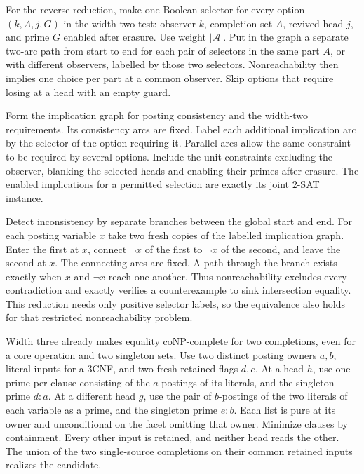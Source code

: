 For the reverse reduction, make one Boolean
selector for every option $(k,A,j,G)$ in the
width-two test: observer $k$, completion set $A$,
revived head $j$, and prime $G$ enabled after
erasure. Use weight $|\mathcal A|$. Put in the
graph a separate two-arc path from start to end
for each pair of selectors in the same part $A$,
or with different observers, labelled by those
two selectors. Nonreachability then implies
one choice per part at a common observer.
Skip options that require losing at a head
with an empty guard.

Form the implication graph for posting
consistency and the width-two requirements.
Its consistency arcs are fixed. Label
each additional implication arc by the
selector of the option requiring it.
Parallel arcs allow the same constraint to
be required by several options. Include the
unit constraints excluding the observer,
blanking the selected heads and enabling
their primes after erasure. The enabled
implications for a permitted selection are
exactly its joint $2$-SAT instance.

Detect inconsistency by separate branches
between the global start and end. For
each posting variable $x$ take two fresh
copies of the labelled implication graph.
Enter the first at $x$, connect $\neg x$
of the first to $\neg x$ of the second,
and leave the second at $x$. The connecting
arcs are fixed. A path through the branch
exists exactly when $x$ and $\neg x$ reach
one another. Thus nonreachability excludes
every contradiction and exactly verifies a
counterexample to sink intersection equality.
This reduction needs only positive selector
labels, so the equivalence also holds for
that restricted nonreachability problem.

Width three already makes equality coNP-complete
for two completions, even for a core operation and
two singleton sets. Use two distinct posting owners
$a,b$, literal inputs for a $3$CNF, and two fresh
retained flags $d,e$. At a head $h$, use one
prime per clause consisting of the $a$-postings
of its literals, and the singleton prime $d{:}a$.
At a different head $g$, use the pair of
$b$-postings of the two literals of each variable
as a prime, and the singleton prime $e{:}b$.
Each list is pure at its owner and unconditional
on the facet omitting that owner. Minimize
clauses by containment. Every other input is
retained, and neither head reads the other.
The union of the two single-source completions
on their common retained inputs realizes the
candidate.

